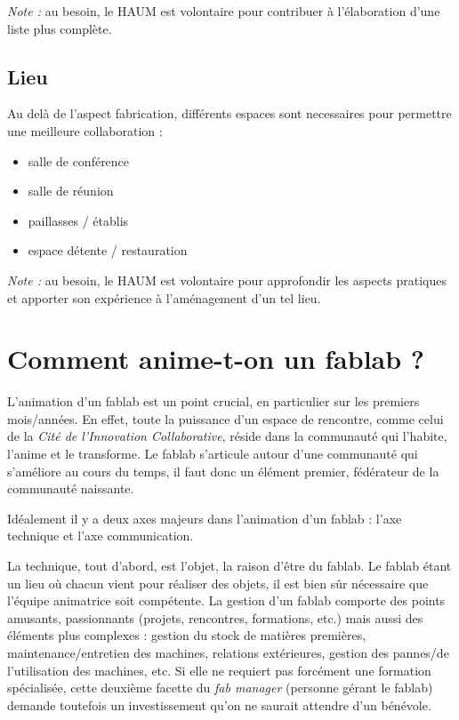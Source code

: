 \documentclass[a4paper,10pt]{scrartcl}
\begin{document}
\textit{Note :} au besoin, le HAUM est volontaire pour contribuer à l'élaboration d'une liste plus complète.

\subsection*{Lieu}

Au delà de l'aspect fabrication, différents espaces sont necessaires pour permettre une meilleure collaboration :
\begin{itemize}
 \item salle de conférence
 \item salle de réunion
 \item paillasses / établis
 \item espace détente / restauration
\end{itemize}

\textit{Note :} au besoin, le HAUM est volontaire pour approfondir les aspects pratiques et apporter son expérience à l'aménagement d'un tel lieu.

\section{Comment anime-t-on un fablab ?}
L'animation d'un fablab est un point crucial, en particulier sur les premiers mois/années. En effet, toute la puissance d'un espace de rencontre, comme celui de la \emph{Cité de l'Innovation Collaborative}, réside dans la communauté qui l'habite, l'anime et le transforme.
Le fablab s'articule autour d'une communauté qui s'améliore au cours du temps, il faut donc un élément premier, fédérateur de la communauté naissante.

Idéalement il y a deux axes majeurs dans l'animation d'un fablab : l'axe technique et l'axe communication.

La technique, tout d'abord, est l'objet, la raison d'être du fablab. Le fablab étant un lieu où chacun vient pour réaliser des objets, il est bien sûr nécessaire que l'équipe animatrice soit compétente.
La gestion d'un fablab comporte des points amusants, passionnants (projets, rencontres, formations, etc.) mais aussi des éléments plus complexes : gestion du stock de matières premières, maintenance/entretien des machines, relations extérieures, gestion des pannes/de l'utilisation des machines, etc.
Si elle ne requiert pas forcément une formation spécialisée, cette deuxième facette du \textit{fab manager} (personne gérant le fablab) demande toutefois un investissement qu'on ne saurait attendre d'un bénévole.
\end{document}
